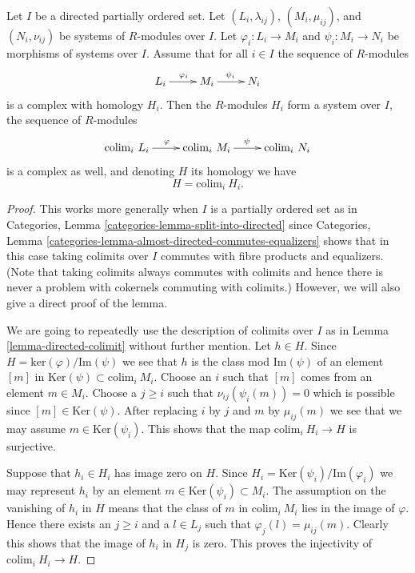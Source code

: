 \begin{lemma}
\label{lemma-directed-colimit-exact}
Let $I$ be a directed partially ordered set.
Let $(L_i, \lambda_{ij})$, $(M_i, \mu_{ij})$, and
$(N_i, \nu_{ij})$ be systems of $R$-modules over $I$.
Let $\varphi_i : L_i \to M_i$ and $\psi_i : M_i \to N_i$ be
morphisms of systems over $I$. Assume that for all $i \in I$ the
sequence of $R$-modules
$$
\xymatrix{
L_i \ar[r]^{\varphi_i} &
M_i \ar[r]^{\psi_i} &
N_i
}
$$
is a complex with homology $H_i$.
Then the $R$-modules $H_i$ form a system over $I$,
the sequence of $R$-modules
$$
\xymatrix{
\text{colim}_i\ L_i \ar[r]^\varphi &
\text{colim}_i\ M_i \ar[r]^\psi &
\text{colim}_i\ N_i
}
$$
is a complex as well, and denoting $H$ its homology we have
$$
H = \text{colim}_i\ H_i.
$$
\end{lemma}

\begin{proof}
This works more generally when $I$ is a partially ordered set as
in Categories, Lemma \ref{categories-lemma-split-into-directed} since
Categories, Lemma \ref{categories-lemma-almost-directed-commutes-equalizers}
shows that in this case taking colimits over
$I$ commutes with fibre products and equalizers.
(Note that taking colimits always commutes with colimits and
hence there is never a problem with cokernels commuting with
colimits.) However, we will also give a direct proof of the lemma.

\medskip\noindent
We are going to repeatedly use the description of colimits over $I$
as in Lemma \ref{lemma-directed-colimit} without further mention.
Let $h \in H$.
Since $H = \text{ker}(\varphi)/\text{Im}(\psi)$ we see that
$h$ is the class mod $\text{Im}(\psi)$ of an element $[m]$
in $\text{Ker}(\psi) \subset \text{colim}_i\ M_i$. Choose an
$i$ such that $[m]$ comes from an element $m \in M_i$. Choose
a $j \geq i$ such that $\nu_{ij}(\psi_i(m)) = 0$ which is possible
since $[m] \in \text{Ker}(\psi)$. After replacing $i$ by $j$ and
$m$ by $\mu_{ij}(m)$ we see that we may assume $m \in \text{Ker}(\psi_i)$.
This shows that the map $\text{colim}_i\ H_i \to H$ is surjective.

\medskip\noindent
Suppose that $h_i \in H_i$ has image zero on $H$. Since
$H_i = \text{Ker}(\psi_i)/\text{Im}(\varphi_i)$ we may represent
$h_i$ by an element $m \in \text{Ker}(\psi_i) \subset M_i$.
The assumption on the vanishing of $h_i$ in $H$ means that
the class of $m$ in $\text{colim}_i\ M_i$ lies in the image
of $\varphi$. Hence there exists an $j \geq i$ and a $l \in L_j$
such that $\varphi_j(l) = \mu_{ij}(m)$. Clearly this shows that
the image of $h_i$ in $H_j$ is zero. This proves the
injectivity of $\text{colim}_i\ H_i \to H$.
\end{proof}

